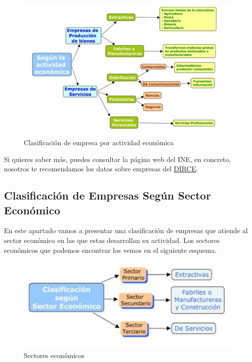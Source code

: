 \begin{figure}[H]
    \centering
    \includegraphics[scale=0.60]{empresas-actividad-economica.png}
    \caption{Clasificación de empresa por actividad económica}
\end{figure}

Si quieres saber más, puedes consultar la página web del INE, en concreto, nosotros te recomendamos los datos sobre empresas del \href{https://www.ine.es/prensa/dirce_2019.pdf}{DIRCE}.

\subsection{Clasificación de Empresas Según Sector Económico}
En este apartado vamos a presentar una clasificación de empresas que atiende al sector económico en las que estas desarrollan su actividad. Los sectores económicos que podemos encontrar los vemos en el siguiente esquema.

\begin{figure}[H]
    \centering
    \includegraphics[scale=0.50]{sectores-economicos.png}
    \caption{Sectores económicos}
\end{figure}

